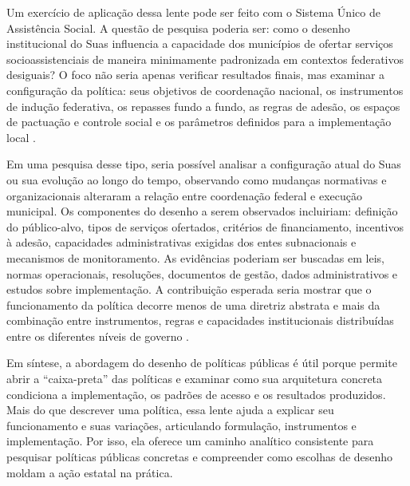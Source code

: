\documentclass[12pt,a4paper]{article}
\begin{document}
Um exercício de aplicação dessa lente pode ser feito com o Sistema Único de Assistência Social. A questão de pesquisa poderia ser: como o desenho institucional do Suas influencia a capacidade dos municípios de ofertar serviços socioassistenciais de maneira minimamente padronizada em contextos federativos desiguais? O foco não seria apenas verificar resultados finais, mas examinar a configuração da política: seus objetivos de coordenação nacional, os instrumentos de indução federativa, os repasses fundo a fundo, as regras de adesão, os espaços de pactuação e controle social e os parâmetros definidos para a implementação local \parencite{bichir2020_sistemas_nacionais}.

Em uma pesquisa desse tipo, seria possível analisar a configuração atual do Suas ou sua evolução ao longo do tempo, observando como mudanças normativas e organizacionais alteraram a relação entre coordenação federal e execução municipal. Os componentes do desenho a serem observados incluiriam: definição do público-alvo, tipos de serviços ofertados, critérios de financiamento, incentivos à adesão, capacidades administrativas exigidas dos entes subnacionais e mecanismos de monitoramento. As evidências poderiam ser buscadas em leis, normas operacionais, resoluções, documentos de gestão, dados administrativos e estudos sobre implementação. A contribuição esperada seria mostrar que o funcionamento da política decorre menos de uma diretriz abstrata e mais da combinação entre instrumentos, regras e capacidades institucionais distribuídas entre os diferentes níveis de governo \parencite{bichir2020_sistemas_nacionais,lotta2019_teorias_analises}.

Em síntese, a abordagem do desenho de políticas públicas é útil porque permite abrir a “caixa-preta” das políticas e examinar como sua arquitetura concreta condiciona a implementação, os padrões de acesso e os resultados produzidos. Mais do que descrever uma política, essa lente ajuda a explicar seu funcionamento e suas variações, articulando formulação, instrumentos e implementação. Por isso, ela oferece um caminho analítico consistente para pesquisar políticas públicas concretas e compreender como escolhas de desenho moldam a ação estatal na prática.

\printbibliography
\end{document}
